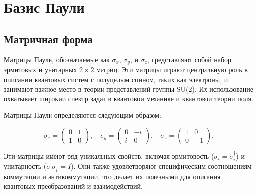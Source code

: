 \documentclass[a4paper]{report}
\begin{document}
\section{Базис Паули}

\subsection{Матричная форма}

Матрицы Паули, обозначаемые как $\sigma_x$, $\sigma_y$, и $\sigma_z$, представляют собой набор эрмитовых и унитарных $2 \times 2$ матриц. Эти матрицы играют центральную роль в описании квантовых систем с полуцелым спином, таких как электроны, и занимают важное место в теории представлений группы SU(2). Их использование охватывает широкий спектр задач в квантовой механике и квантовой теории поля.

Матрицы Паули определяются следующим образом:

$$
\sigma_x = \begin{pmatrix}
0 & 1 \\
1 & 0
\end{pmatrix}, \quad
\sigma_y = \begin{pmatrix}
0 & -i \\
i & 0
\end{pmatrix}, \quad
\sigma_z = \begin{pmatrix}
1 & 0 \\
0 & -1
\end{pmatrix}.
$$


Эти матрицы имеют ряд уникальных свойств, включая эрмитовость ($\sigma_i = \sigma_i^\dagger$) и унитарность ($\sigma_i \sigma_i^\dagger = I$). Они также удовлетворяют специфическим соотношениям коммутации и антикоммутации, что делает их полезными для описания квантовых преобразований и взаимодействий.
\end{document}
